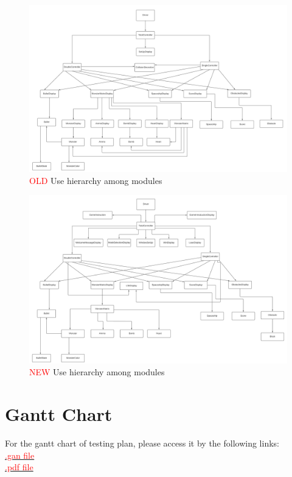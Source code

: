 \documentclass[12pt]{article}
\begin{document}
\begin{figure}[h!]
\centering
\includegraphics[scale = 0.35]{USE_H2.png}
\caption{\textcolor{red}{OLD} Use hierarchy among modules}
\label{FigUH}
\end{figure}
\newpage
\begin{figure}[h!]
\centering
\includegraphics[scale = 0.35]{Revised_H.png}
\caption{\textcolor{red}{NEW} Use hierarchy among modules}
\label{FigUH}
\end{figure}

\section{Gantt Chart}
For the gantt chart of testing plan, please access it by the 
following links:\\
\href{https://gitlab.cas.mcmaster.ca/shit19/2022_winter_3xa3_l03_g07/-/blob/main/ProjectSchedule/Gantt_Project_Design_Finished.gan}{\textcolor{red}{.gan file}}
\\
\href{https://gitlab.cas.mcmaster.ca/shit19/2022_winter_3xa3_l03_g07/-/blob/main/ProjectSchedule/Gantt_Project_Design_Finished.pdf}{\textcolor{red}{.pdf file}}
\end{document}
